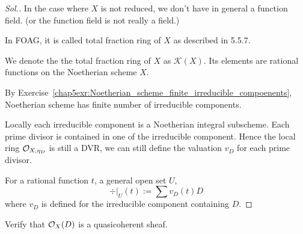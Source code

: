 \documentclass[11pt]{book} %
\begin{document}
\begin{proof}[Sol.]
In the case where $X$ is not reduced, we don't have in general a function field. (or the function field is not really a  field.) 

In FOAG, it is called total fraction ring of $X$ as described in 5.5.7.

We denote the the total fraction ring of $X$ as $\mathcal{K}(X)$. Its elements are rational functions on the Noetherian scheme $X$.

By Exercise~\ref{chap5exr:Noetherian_scheme_finite_irreducible_compoenents}, Noetherian scheme has finite number of irreducible components.

Locally each irreducible component is a Noetherian integral subscheme. Each prime divisor is contained in one of the irreducible component. Hence the local ring ${\cal O}_{X,\eta_D}$ is still a DVR, we can still define the valuation $v_D$ for each prime divisor.

For a rational function $t$, a general open set $U$,
$$
\div|_U(t):=\sum v_D(t) D
$$ 
where $v_D$ is defined for the irreducible component containing $D$.
\end{proof}
\begin{exr}
Verify that ${\cal O}_X(D)$ is a quasicoherent sheaf.
\end{exr}
\end{document}
